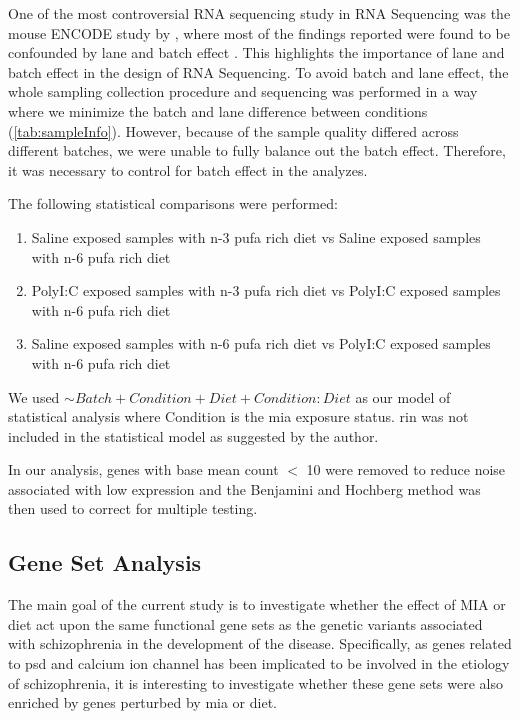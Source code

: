 \documentclass[12pt]{scrbook}
\newcommand*{\scz}{schizophrenia}
\begin{document}
One of the most controversial RNA sequencing study  in RNA Sequencing was the mouse ENCODE study by \citet{Yue2014}, where most of the findings reported were found to be confounded by lane and batch effect \citet{Gilad2015}.
This highlights the importance of lane and batch effect in the design of RNA Sequencing.
To avoid batch and lane effect, the whole sampling collection procedure and sequencing was performed in a way where we minimize the batch and lane difference between conditions (\cref{tab:sampleInfo}). 
However, because of the sample quality differed across different batches, we were unable to fully balance out the batch effect. 
Therefore, it was necessary to control for batch effect in the analyzes.

The following statistical comparisons were performed:
\begin{enumerate}
	\item Saline exposed samples with n-3 \gls{pufa} rich diet vs Saline exposed samples with n-6 \gls{pufa} rich diet 
	\item PolyI:C exposed samples with n-3 \gls{pufa} rich diet vs PolyI:C exposed samples with n-6 \gls{pufa} rich diet 
	\item Saline exposed samples with n-6 \gls{pufa} rich diet vs PolyI:C exposed samples with n-6 \gls{pufa} rich diet 
\end{enumerate}
We used $\sim Batch+Condition+Diet+Condition:Diet$ as our model of statistical analysis where Condition is the \gls{mia} exposure status.
\Gls{rin} was not included in the statistical model as suggested by the author.

In our analysis, genes with base mean count $<$ 10 were removed to reduce noise associated with low expression and the Benjamini and Hochberg method was then used to correct for multiple testing.

\subsection{Gene Set Analysis}
\label{sec:function}
The main goal of the current study is to investigate whether the effect of MIA or diet act upon the same functional gene sets as the genetic variants associated with schizophrenia in the development of the disease. 
Specifically, as genes related to \gls{psd} \citep{purcell2014polygenic,Consortium2015a} and calcium ion channel \citep{purcell2014polygenic,Ripke2014,Szatkiewicz2014} has been implicated to be involved in the etiology of \scz, it is interesting to investigate whether these gene sets were also enriched by genes perturbed by \gls{mia} or diet.
\end{document}
